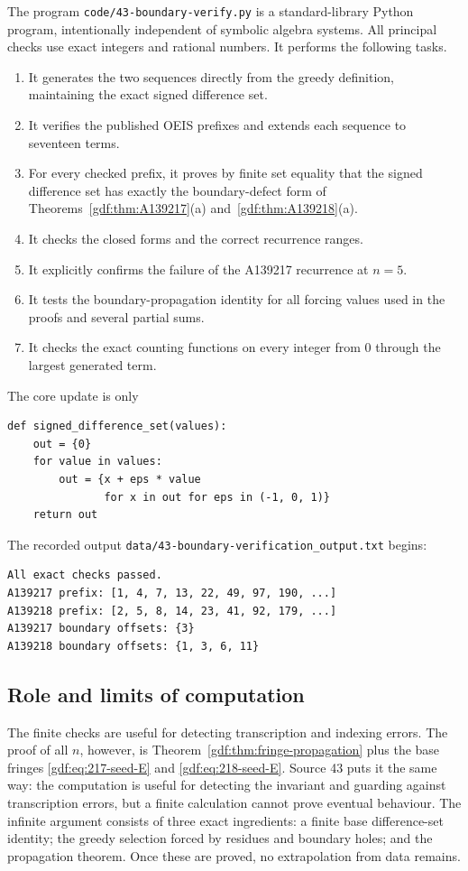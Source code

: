 \documentclass[11pt,a4paper]{article}
\numberwithin{equation}{section}
\theoremstyle{definition}
\theoremstyle{remark}
\theoremstyle{plain}
\newcommand{\file}[1]{\nolinkurl{#1}}
\begin{document}
The program \file{code/43-boundary-verify.py} is a standard-library Python
program, intentionally independent of symbolic algebra systems.  All principal
checks use exact integers and rational numbers.  It performs the following
tasks.
\begin{enumerate}[label=(\arabic*)]
\item It generates the two sequences directly from the greedy definition,
      maintaining the exact signed difference set.
\item It verifies the published OEIS prefixes and extends each sequence to
      seventeen terms.
\item For every checked prefix, it proves by finite set equality that the
      signed difference set has exactly the boundary-defect form of
      Theorems~\ref{gdf:thm:A139217}(a) and~\ref{gdf:thm:A139218}(a).
\item It checks the closed forms and the correct recurrence ranges.
\item It explicitly confirms the failure of the A139217 recurrence at $n=5$.
\item It tests the boundary-propagation identity for all forcing values used
      in the proofs and several partial sums.
\item It checks the exact counting functions on every integer from $0$
      through the largest generated term.
\end{enumerate}
The core update is only
\begin{verbatim}
def signed_difference_set(values):
    out = {0}
    for value in values:
        out = {x + eps * value
               for x in out for eps in (-1, 0, 1)}
    return out
\end{verbatim}
The recorded output \file{data/43-boundary-verification_output.txt} begins:
\begin{verbatim}
All exact checks passed.
A139217 prefix: [1, 4, 7, 13, 22, 49, 97, 190, ...]
A139218 prefix: [2, 5, 8, 14, 23, 41, 92, 179, ...]
A139217 boundary offsets: {3}
A139218 boundary offsets: {1, 3, 6, 11}
\end{verbatim}

\subsection{Role and limits of computation}

The finite checks are useful for detecting transcription and indexing errors.
The proof of all $n$, however, is Theorem~\ref{gdf:thm:fringe-propagation} plus the
base fringes \eqref{gdf:eq:217-seed-E} and \eqref{gdf:eq:218-seed-E}.
Source 43 puts it the same way: the computation is useful for detecting the
invariant and guarding against transcription errors, but a finite calculation
cannot prove eventual behaviour.  The infinite argument consists of three
exact ingredients: a finite base difference-set identity; the greedy selection
forced by residues and boundary holes; and the propagation theorem.  Once
these are proved, no extrapolation from data remains.
\end{document}
